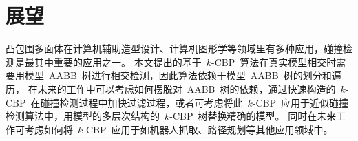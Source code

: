 \section{展望}
\label{sec:futurework}

凸包围多面体在计算机辅助造型设计、计算机图形学等领域里有多种应用，碰撞检测是最其中重要的应用之一。
本文提出的基于~$k$-CBP~算法在真实模型相交时需要用模型~AABB~树进行相交检测，因此算法依赖于模型~AABB~树的划分和遍历，
在未来的工作中可以考虑如何摆脱对~AABB~树的依赖，通过快速构造的~$k$-CBP~在碰撞检测过程中加快过滤过程，或者可考虑将此~$k$-CBP~应用于近似碰撞检测算法中，用模型的多层次结构的~$k$-CBP~树替换精确的模型。
同时在未来工作可考虑如何将~$k$-CBP~应用于如机器人抓取、路径规划等其他应用领域中。

